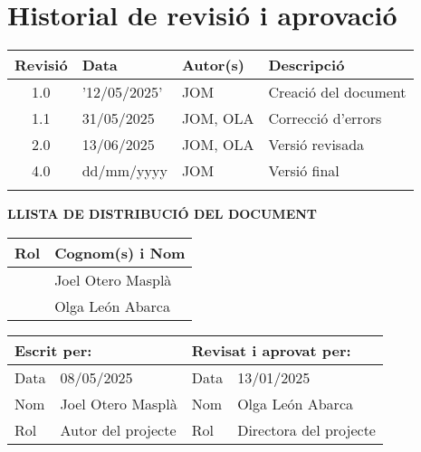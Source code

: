 \vspace*{0cm}

\chapter*{Historial de revisió i aprovació}

\begin{tabularx}{\textwidth}{|c|l|l|X|}
  \hline
    \textbf{Revisió} & \textbf{Data} & \textbf{Autor(s)} & \textbf{Descripció} \\
  \hline
    1.0 & '12/05/2025' & JOM & Creació del document \\
  \hline
    1.1 & 31/05/2025 & JOM, OLA & Correcció d'errors \\
  \hline
    2.0 & 13/06/2025 & JOM, OLA & Versió revisada \\
  \hline
    4.0 & dd/mm/yyyy & JOM & Versió final \\
  \hline
    & & & \\
  \hline
\end{tabularx}

\vspace{1cm}

\textbf{LLISTA DE DISTRIBUCIÓ DEL DOCUMENT}

\begin{tabularx}{\textwidth}{|l|X|}
  \hline
    \textbf{Rol} & \textbf{Cognom(s) i Nom} \\
  \hline
    [Estudiant] & Joel Otero Masplà \\
  \hline
    [Directora del projecte] & Olga León Abarca \\
  \hline
\end{tabularx}

\vspace{1cm}

\begin{tabularx}{\textwidth}{|l|X||l|X|}
  \hline
    \multicolumn{2}{|l||}{\textbf{Escrit per:}}  &  \multicolumn{2}{l|}{\textbf{Revisat i aprovat per:}} \\
  \hline
    Data &  08/05/2025 & Data &  13/01/2025 \\
  \hline
    Nom &  Joel Otero Masplà & Nom &  Olga León Abarca \\
  \hline
    Rol & Autor del projecte & Rol & Directora del projecte \\
  \hline
\end{tabularx}

